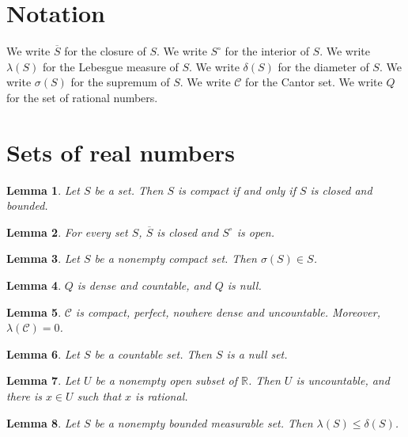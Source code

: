 \documentclass{article}
\newtheorem{lemma}{Lemma}
\begin{document}
\section{Notation}

We write $\overline{S}$ for the closure of $S$.
We write $S^\circ$ for the interior of $S$.
We write $\lambda(S)$ for the Lebesgue measure of $S$.
We write $\delta(S)$ for the diameter of $S$.
We write $\sigma(S)$ for the supremum of $S$.
We write $\mathcal{C}$ for the Cantor set.
We write $Q$ for the set of rational numbers.

\section{Sets of real numbers}

\begin{lemma}\label{heine}
Let $S$ be a set. Then $S$ is compact if and only if $S$ is closed and bounded.
\end{lemma}

\begin{lemma}\label{closure}
For every set $S$, $\overline{S}$ is closed and $S^\circ$ is open.
\end{lemma}

\begin{lemma}\label{supremum}
Let $S$ be a nonempty compact set. Then $\sigma(S)\in S$.
\end{lemma}

\begin{lemma}\label{rationals}
$Q$ is dense and countable, and $Q$ is null.
\end{lemma}

\begin{lemma}\label{cantor}
$\mathcal{C}$ is compact, perfect, nowhere dense and uncountable. Moreover, $\lambda(\mathcal{C})=0$.
\end{lemma}

\begin{lemma}\label{countable}
Let $S$ be a countable set. Then $S$ is a null set.
\end{lemma}

\begin{lemma}\label{open}
Let $U$ be a nonempty open subset of $\mathbb{R}$. Then $U$ is uncountable, and there is $x\in U$ such that $x$ is rational.
\end{lemma}

\begin{lemma}\label{measure}
Let $S$ be a nonempty bounded measurable set. Then $\lambda(S)\le\delta(S)$.
\end{lemma}
\end{document}
